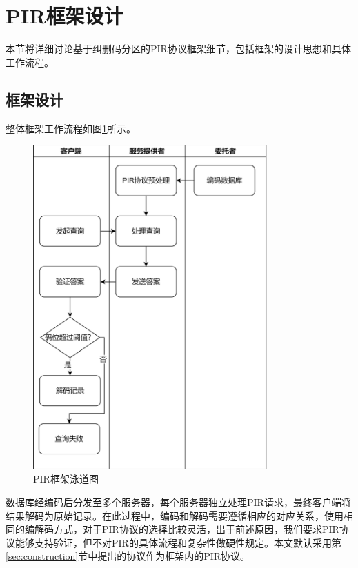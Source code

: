 \section{PIR框架设计}
\label{sec:pir-framework}

本节将详细讨论基于纠删码分区的PIR协议框架细节，包括框架的设计思想和具体工作流程。

\subsection{框架设计}
整体框架工作流程如图\ref{fig:pir-framework-lane}所示。

\begin{figure}
    \centering
    \includegraphics[width=0.8\textwidth]{figure/查询框架泳道图.png}
    \caption{PIR框架泳道图}
    \label{fig:pir-framework-lane}
\end{figure}

数据库经编码后分发至多个服务器，每个服务器独立处理PIR请求，最终客户端将结果解码为原始记录。在此过程中，编码和解码需要遵循相应的对应关系，使用相同的编解码方式，对于PIR协议的选择比较灵活，出于前述原因，我们要求PIR协议能够支持验证，但不对PIR的具体流程和复杂性做硬性规定。本文默认采用第\ref{sec:construction}节中提出的协议作为框架内的PIR协议。

